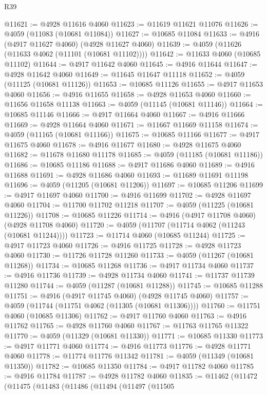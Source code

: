 \begin{lexlean}{R39}
\begin{coremodule}
@11621 := @4928 @11616 @4060
@11623 := @11619 @11621 @11076
@11626 := @4059 (@11083 (@10681 @11084))
@11627 := @10685 @11084
@11633 := @4916 (@4917 @11627 @4060) (@4928 @11627 @4060)
@11639 := @4059 (@11626 (@11633 @4062 (@11101 (@10681 @11102))))
@11642 := @11633 @4060 (@10685 @11102)
@11644 := @4917 @11642 @4060
@11645 := @4916 @11644
@11647 := @4928 @11642 @4060
@11649 := @11645 @11647 @11118
@11652 := @4059 (@11125 (@10681 @11126))
@11653 := @10685 @11126
@11655 := @4917 @11653 @4060
@11656 := @4916 @11655
@11658 := @4928 @11653 @4060
@11660 := @11656 @11658 @11138
@11663 := @4059 (@11145 (@10681 @11146))
@11664 := @10685 @11146
@11666 := @4917 @11664 @4060
@11667 := @4916 @11666
@11669 := @4928 @11664 @4060
@11671 := @11667 @11669 @11158
@11674 := @4059 (@11165 (@10681 @11166))
@11675 := @10685 @11166
@11677 := @4917 @11675 @4060
@11678 := @4916 @11677
@11680 := @4928 @11675 @4060
@11682 := @11678 @11680 @11178
@11685 := @4059 (@11185 (@10681 @11186))
@11686 := @10685 @11186
@11688 := @4917 @11686 @4060
@11689 := @4916 @11688
@11691 := @4928 @11686 @4060
@11693 := @11689 @11691 @11198
@11696 := @4059 (@11205 (@10681 @11206))
@11697 := @10685 @11206
@11699 := @4917 @11697 @4060
@11700 := @4916 @11699
@11702 := @4928 @11697 @4060
@11704 := @11700 @11702 @11218
@11707 := @4059 (@11225 (@10681 @11226))
@11708 := @10685 @11226
@11714 := @4916 (@4917 @11708 @4060) (@4928 @11708 @4060)
@11720 := @4059 (@11707 (@11714 @4062 (@11243 (@10681 @11244))))
@11723 := @11714 @4060 (@10685 @11244)
@11725 := @4917 @11723 @4060
@11726 := @4916 @11725
@11728 := @4928 @11723 @4060
@11730 := @11726 @11728 @11260
@11733 := @4059 (@11267 (@10681 @11268))
@11734 := @10685 @11268
@11736 := @4917 @11734 @4060
@11737 := @4916 @11736
@11739 := @4928 @11734 @4060
@11741 := @11737 @11739 @11280
@11744 := @4059 (@11287 (@10681 @11288))
@11745 := @10685 @11288
@11751 := @4916 (@4917 @11745 @4060) (@4928 @11745 @4060)
@11757 := @4059 (@11744 (@11751 @4062 (@11305 (@10681 @11306))))
@11760 := @11751 @4060 (@10685 @11306)
@11762 := @4917 @11760 @4060
@11763 := @4916 @11762
@11765 := @4928 @11760 @4060
@11767 := @11763 @11765 @11322
@11770 := @4059 (@11329 (@10681 @11330))
@11771 := @10685 @11330
@11773 := @4917 @11771 @4060
@11774 := @4916 @11773
@11776 := @4928 @11771 @4060
@11778 := @11774 @11776 @11342
@11781 := @4059 (@11349 (@10681 @11350))
@11782 := @10685 @11350
@11784 := @4917 @11782 @4060
@11785 := @4916 @11784
@11787 := @4928 @11782 @4060
@11835 := @11462
    (@11472
      (@11475
        (@11483
          (@11486
            (@11494
              (@11497
                (@11505

\end{coremodule}
\end{lexlean}
